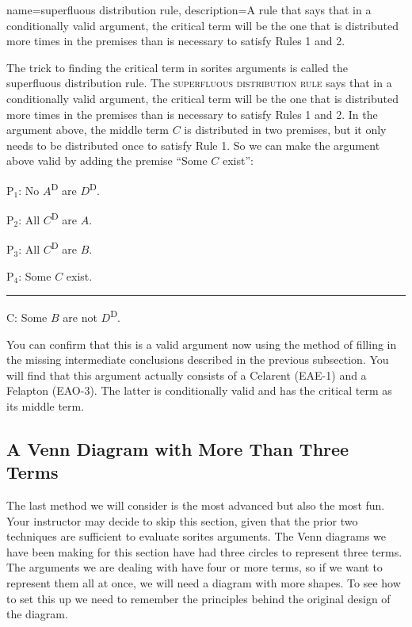 {
name=superfluous distribution rule,
description={A rule that says that in a conditionally valid argument, the critical term will be the one that is distributed more times in the premises than is necessary to satisfy Rules 1 and 2.}
}

The trick to finding the critical term in sorites arguments is called the superfluous distribution rule. The \textsc{\gls{superfluous distribution rule}} \label{def:superfluous_distribution_rule} says that in a conditionally valid argument, the critical term will be the one that is distributed more times in the premises than is necessary to satisfy Rules 1 and 2. In the argument above, the middle term $C$ is distributed in two premises, but it only needs to be distributed once to satisfy Rule 1. So we can make the argument above valid by adding the premise ``Some $C$ exist'':


\begin{earg}
\item[P$_1$:] No $A$\textsuperscript{D} are $D$\textsuperscript{D}. 
\item[P$_2$:] All $C$\textsuperscript{D} are $A$.  %
\item[P$_3$:] All $C$\textsuperscript{D} are $B$. 
\item[P$_4$:] Some $C$ exist.
\vspace{-.5em}
\item [] \rule{0.3\linewidth}{.5pt} 
\item[C:] Some $B$ are not $D$\textsuperscript{D}. %
\end{earg} 

You can confirm that this is a valid argument now using the method of filling in the missing intermediate conclusions described in the previous subsection. You will find that this argument actually consists of a Celarent (EAE-1) and a Felapton (EAO-3). The latter is conditionally valid and has the critical term as its middle term.  

\subsection{A Venn Diagram with More Than Three Terms}

The last method we will consider is the most advanced but also the most fun. Your instructor may decide to skip this section, given that the prior two techniques are sufficient to evaluate sorites arguments. The Venn diagrams we have been making for this section have had three circles to represent three terms. The arguments we are dealing with have four or more terms, so if we want to represent them all at once, we will need a diagram with more shapes. To see how to set this up we need to remember the principles behind the original design of the diagram. 

